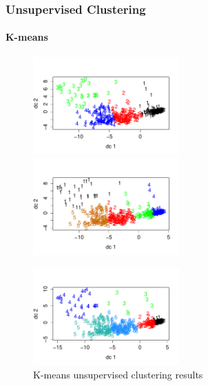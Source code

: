 \documentclass[10pt]{beamer}
\begin{document}
  \begin{frame}
    \frametitle{Unsupervised Clustering}
    \framesubtitle{K-means}

    \begin{figure}
    \centering
    \includegraphics[width=0.5\textwidth]{4.pdf}
    \includegraphics[width=0.5\textwidth]{5.pdf}
    \end{figure}

    \begin{figure}
    \centering
    \includegraphics[width=0.5\textwidth]{6.pdf}
    \caption{K-means unsupervised clustering results}
    \end{figure}
    \end{frame}
\end{document}
